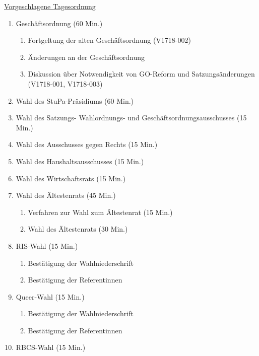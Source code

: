 \documentclass[ngerman,headheight=70pt]{scrartcl}
\begin{document}
    \newpage
    \underline{Vorgeschlagene Tagesordnung}
    \begin{enumerate}[label={\textbf{Top \theenumi}},leftmargin=*]
        \item Geschäftsordnung (60 Min.)
            \begin{enumerate}
                \item Fortgeltung der alten Geschäftsordnung (V1718-002)
                \item Änderungen an der Geschäftsordnung
                \item Diskussion über Notwendigkeit von GO-Reform und
                Satzungsänderungen (V1718-001, V1718-003)
            \end{enumerate}
        \item Wahl des StuPa-Präsidiums (60 Min.)
        \item Wahl des Satzungs- Wahlordnungs- und  Geschäftsordnungsausschusses (15 Min.)
        \item Wahl des Ausschusses gegen Rechts (15 Min.)
        \item Wahl des Haushaltsausschusses (15 Min.)
        \item Wahl des Wirtschaftsrats (15 Min.)
        \item Wahl des Ältestenrats (45 Min.)
            \begin{enumerate}
                \item Verfahren zur Wahl zum Ältestenrat (15 Min.)
                \item Wahl des Ältestenrats (30 Min.)
            \end{enumerate}
        \item RIS-Wahl (15 Min.)
            \begin{enumerate}
                \item Bestätigung der Wahlniederschrift
                \item Bestätigung der Referentinnen
            \end{enumerate}
        \item Queer-Wahl (15 Min.)
            \begin{enumerate}
                \item Bestätigung der Wahlniederschrift
                \item Bestätigung der Referentinnen
            \end{enumerate}
        \item RBCS-Wahl (15 Min.)

\end{enumerate}
\end{document}
